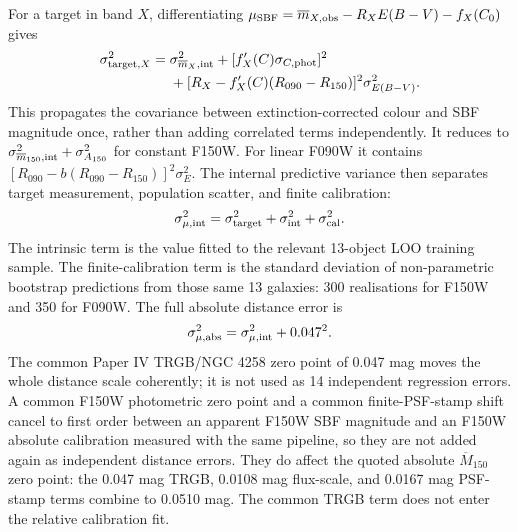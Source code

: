 \documentclass[nodoi,nocopyright]{pas}
\newcommand{\mbar}{\overline{m}}
\newcommand{\Mbar}{\overline{M}}
\begin{document}
For a target in band $X$, differentiating
$\mu_{\rm SBF}=\mbar_{X,\rm obs}-R_XE(B-V)-f_X(C_0)$ gives
\begin{align}
 \sigma^2_{{\rm target},X}={}&\sigma^2_{\mbar_X,\rm int}
 +[f'_X(C)\sigma_{C,\rm phot}]^2\\
 &+[R_X-f'_X(C)(R_{090}-R_{150})]^2\sigma^2_{E(B-V)}.
 \label{eq:target-error}
\end{align}
This propagates the covariance between extinction-corrected colour and SBF
magnitude once, rather than adding correlated terms independently. It reduces
to $\sigma^2_{\mbar_{150},\rm int}+\sigma^2_{A_{150}}$ for constant F150W.
For linear F090W it contains
$[R_{090}-b(R_{090}-R_{150})]^2\sigma_E^2$. The internal predictive variance
then separates target measurement, population scatter, and finite calibration:
\begin{equation}
 \sigma^2_{\mu,\rm int}=
 \sigma^2_{\rm target}+\sigma^2_{\rm int}+\sigma^2_{\rm cal}.
 \label{eq:predictive-error}
\end{equation}
The intrinsic term is the value fitted to the relevant 13-object LOO training
sample. The finite-calibration term is the standard deviation of
non-parametric bootstrap predictions from those same 13 galaxies: 300
realisations for F150W and 350 for F090W. The full
absolute distance error is
\begin{equation}
 \sigma^2_{\mu,\rm abs}=\sigma^2_{\mu,\rm int}+0.047^2.
 \label{eq:absolute-distance-error}
\end{equation}
The common Paper IV TRGB/NGC 4258 zero point of 0.047 mag moves the whole
distance scale coherently; it is not used as 14 independent regression errors.
A common F150W
photometric zero point and a common finite-PSF-stamp shift cancel to first
order between an apparent F150W SBF magnitude and an F150W absolute
calibration measured with the same pipeline, so they are not added again as
independent distance errors. They do affect the quoted absolute $\Mbar_{150}$
zero point: the 0.047 mag TRGB, 0.0108 mag flux-scale, and 0.0167 mag
PSF-stamp terms combine to 0.0510 mag. The common TRGB term does not enter the
relative calibration fit.
\end{document}
